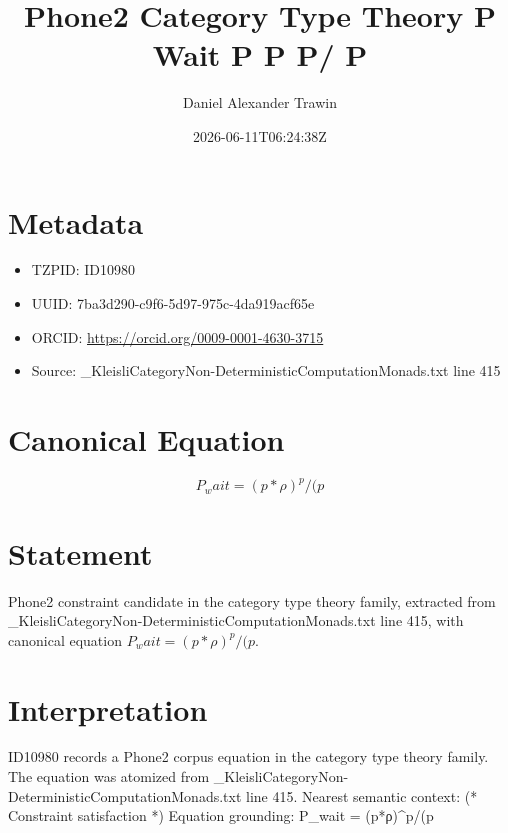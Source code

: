 \documentclass[11pt]{article}
\title{Phone2 Category Type Theory P Wait P Ρ P/ P}
\author{Daniel Alexander Trawin}
\date{2026-06-11T06:24:38Z}
\begin{document}
\maketitle
\section*{Metadata}
\begin{itemize}
\item TZPID: ID10980
\item UUID: 7ba3d290-c9f6-5d97-975c-4da919acf65e
\item ORCID: \url{https://orcid.org/0009-0001-4630-3715}
\item Source: _KleisliCategoryNon-DeterministicComputationMonads.txt line 415
\end{itemize}
\section*{Canonical Equation}
\[
P_wait = (p*ρ)^p/(p
\]
\section*{Statement}
Phone2 constraint candidate in the category type theory family, extracted from _KleisliCategoryNon-DeterministicComputationMonads.txt line 415, with canonical equation $P_wait = (p*ρ)^p/(p$.
\section*{Interpretation}
ID10980 records a Phone2 corpus equation in the category type theory family. The equation was atomized from _KleisliCategoryNon-DeterministicComputationMonads.txt line 415. Nearest semantic context: (* Constraint satisfaction *) Equation grounding: P_wait = (p*ρ)^p/(p
\end{document}
